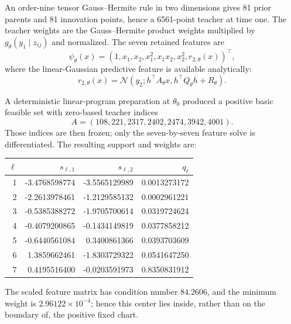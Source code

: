 An order-nine tensor Gauss--Hermite rule in two dimensions gives 81 prior
parents and 81 innovation points, hence a 6561-point teacher at time one.  The
teacher weights are the Gauss--Hermite product weights multiplied by
\(g_\theta(y_1\mid z_{ij})\) and normalized.  The seven retained features are
\begin{equation}
\label{eq:bf-ledh-score-aware-lgssm-features}
  \psi_\theta(x)
  =\left(1,x_1,x_2,x_1^2,x_1x_2,x_2^2,r_{2,\theta}(x)\right)^\top,
\end{equation}
where the linear-Gaussian predictive feature is available analytically:
\begin{equation}
  r_{2,\theta}(x)
  =\mathcal N\!\left(
    y_2;h^\top A_\theta x,
    h^\top Q_\theta h+R_\theta
  \right).
\end{equation}

A deterministic linear-program preparation at \(\theta_0\) produced a positive
basic feasible set with zero-based teacher indices
\[
  A=(108,221,2317,2402,2474,3942,4001).
\]
Those indices are then frozen; only the seven-by-seven feature solve is
differentiated.  The resulting support and weights are:
\begin{center}
\begin{tabular}{rrrr}
\toprule
\(\ell\) & \(s_{\ell,1}\) & \(s_{\ell,2}\) & \(q_\ell\)\\
\midrule
1 & -3.4768598774 & -3.5565129989 & 0.0013273172\\
2 & -2.2613978461 & -1.2129585132 & 0.0002961221\\
3 & -0.5385388272 & -1.9705700614 & 0.0319724624\\
4 & -0.4079200865 & -0.1434149819 & 0.0377858212\\
5 & -0.6440561084 &  0.3400861366 & 0.0393703609\\
6 &  1.3859662461 & -1.8303729322 & 0.0541647250\\
7 &  0.4195516400 & -0.0203591973 & 0.8350831912\\
\bottomrule
\end{tabular}
\end{center}
The scaled feature matrix has condition number \(84.2606\), and the minimum
weight is \(2.96122\times10^{-4}\); hence this center lies inside, rather than on
the boundary of, the positive fixed chart.

